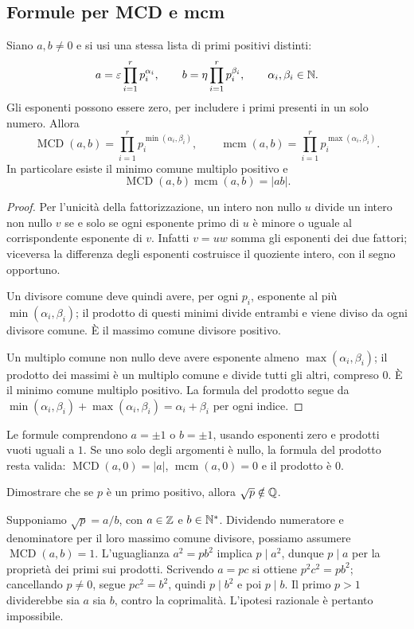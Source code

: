 \subsection{Formule per MCD e mcm}
\begin{proposizione}\label{prop:mcd-mcm}
Siano $a,b\ne0$ e si usi una stessa lista di primi positivi distinti:
\[
a=\varepsilon\prod_{i=1}^r p_i^{\alpha_i},\qquad
b=\eta\prod_{i=1}^r p_i^{\beta_i},\qquad\alpha_i,\beta_i\in\mathbb{N}.
\]
Gli esponenti possono essere zero, per includere i primi presenti in un solo numero. Allora
\[
\operatorname{MCD}(a,b)=\prod_{i=1}^r p_i^{\min(\alpha_i,\beta_i)},
\qquad
\operatorname{mcm}(a,b)=\prod_{i=1}^r p_i^{\max(\alpha_i,\beta_i)}.
\]
In particolare esiste il minimo comune multiplo positivo e
\[
\operatorname{MCD}(a,b)\operatorname{mcm}(a,b)=|ab|.
\]
\end{proposizione}
\begin{proof}
Per l'unicità della fattorizzazione, un intero non nullo $u$ divide un intero non nullo $v$ se e solo se ogni esponente primo di $u$ è minore o uguale al corrispondente esponente di $v$. Infatti $v=uw$ somma gli esponenti dei due fattori; viceversa la differenza degli esponenti costruisce il quoziente intero, con il segno opportuno.

Un divisore comune deve quindi avere, per ogni $p_i$, esponente al più $\min(\alpha_i,\beta_i)$; il prodotto di questi minimi divide entrambi e viene diviso da ogni divisore comune. È il massimo comune divisore positivo.

Un multiplo comune non nullo deve avere esponente almeno $\max(\alpha_i,\beta_i)$; il prodotto dei massimi è un multiplo comune e divide tutti gli altri, compreso $0$. È il minimo comune multiplo positivo. La formula del prodotto segue da $\min(\alpha_i,\beta_i)+\max(\alpha_i,\beta_i)=\alpha_i+\beta_i$ per ogni indice.
\end{proof}

\begin{osservazione}
Le formule comprendono $a=\pm1$ o $b=\pm1$, usando esponenti zero e prodotti vuoti uguali a $1$. Se uno solo degli argomenti è nullo, la formula del prodotto resta valida: $\operatorname{MCD}(a,0)=|a|$, $\operatorname{mcm}(a,0)=0$ e il prodotto è $0$.
\end{osservazione}

\begin{esercizio}
Dimostrare che se $p$ è un primo positivo, allora $\sqrt p\notin\mathbb{Q}$.
\end{esercizio}
\begin{svolgimento}
Supponiamo $\sqrt p=a/b$, con $a\in\mathbb{Z}$ e $b\in\mathbb{N}^*$. Dividendo numeratore e denominatore per il loro massimo comune divisore, possiamo assumere $\operatorname{MCD}(a,b)=1$. L'uguaglianza $a^2=pb^2$ implica $p\mid a^2$, dunque $p\mid a$ per la proprietà dei primi sui prodotti. Scrivendo $a=pc$ si ottiene $p^2c^2=pb^2$; cancellando $p\ne0$, segue $pc^2=b^2$, quindi $p\mid b^2$ e poi $p\mid b$. Il primo $p>1$ dividerebbe sia $a$ sia $b$, contro la coprimalità. L'ipotesi razionale è pertanto impossibile.
\end{svolgimento}

